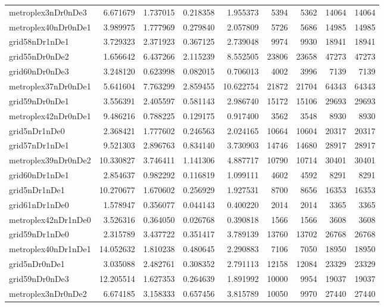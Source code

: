 \begin{longtable}{|l|r|r|r|r|r|r|r|r|}
metroplex3nDr0nDe3 & 6.671679 & 1.737015 & 0.218358 & 1.955373 & 5394 & 5362 & 14064 & 14064 \\
metroplex40nDr0nDe1 & 3.989975 & 1.777969 & 0.279840 & 2.057809 & 5726 & 5686 & 14985 & 14985 \\
grid58nDr1nDe1 & 3.729323 & 2.371923 & 0.367125 & 2.739048 & 9974 & 9930 & 18941 & 18941 \\
grid55nDr0nDe2 & 1.656642 & 6.437266 & 2.115239 & 8.552505 & 23806 & 23658 & 47273 & 47273 \\
grid60nDr0nDe3 & 3.248120 & 0.623998 & 0.082015 & 0.706013 & 4002 & 3996 & 7139 & 7139 \\
metroplex37nDr0nDe1 & 5.641604 & 7.763299 & 2.859455 & 10.622754 & 21872 & 21704 & 64343 & 64343 \\
grid59nDr0nDe1 & 3.556391 & 2.405597 & 0.581143 & 2.986740 & 15172 & 15106 & 29693 & 29693 \\
metroplex42nDr0nDe1 & 9.486216 & 0.788225 & 0.129175 & 0.917400 & 3562 & 3548 & 8930 & 8930 \\
grid5nDr1nDe0 & 2.368421 & 1.777602 & 0.246563 & 2.024165 & 10664 & 10604 & 20317 & 20317 \\
grid57nDr1nDe1 & 9.521303 & 2.896763 & 0.834140 & 3.730903 & 14746 & 14680 & 28917 & 28917 \\
metroplex39nDr0nDe2 & 10.330827 & 3.746411 & 1.141306 & 4.887717 & 10790 & 10714 & 30401 & 30401 \\
grid60nDr1nDe1 & 2.854637 & 0.982292 & 0.116819 & 1.099111 & 4602 & 4592 & 8291 & 8291 \\
grid5nDr1nDe1 & 10.270677 & 1.670602 & 0.256929 & 1.927531 & 8700 & 8656 & 16353 & 16353 \\
grid61nDr1nDe0 & 1.578947 & 0.356077 & 0.044143 & 0.400220 & 2014 & 2014 & 3365 & 3365 \\
metroplex42nDr1nDe0 & 3.526316 & 0.364050 & 0.026768 & 0.390818 & 1566 & 1566 & 3608 & 3608 \\
grid59nDr1nDe0 & 2.315789 & 3.437722 & 0.351417 & 3.789139 & 13760 & 13702 & 26768 & 26768 \\
metroplex40nDr1nDe1 & 14.052632 & 1.810238 & 0.480645 & 2.290883 & 7106 & 7050 & 18950 & 18950 \\
grid5nDr0nDe1 & 3.035088 & 2.482761 & 0.308352 & 2.791113 & 12158 & 12084 & 23329 & 23329 \\
grid59nDr0nDe3 & 12.205514 & 1.627353 & 0.264639 & 1.891992 & 10000 & 9954 & 19037 & 19037 \\
metroplex3nDr0nDe2 & 6.674185 & 3.158333 & 0.657456 & 3.815789 & 10050 & 9970 & 27440 & 27440 \\

\end{longtable}
